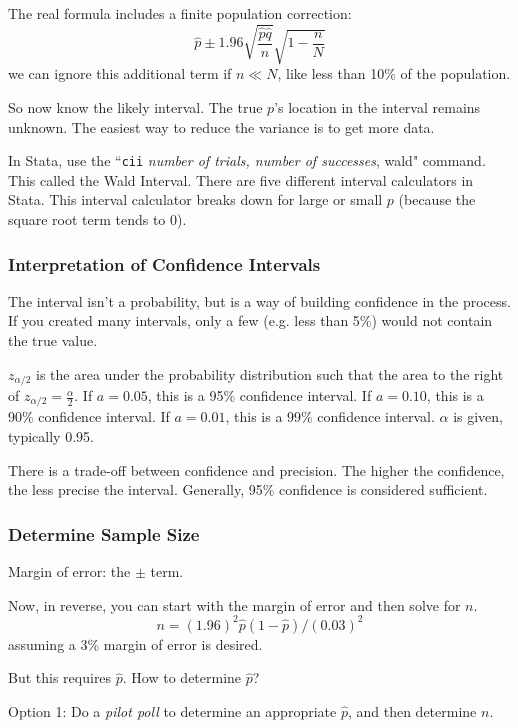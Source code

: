 \documentclass[11pt, oneside]{article}   	%
\begin{document}
The real formula includes a finite population correction:
\[
\hat{p} \pm 1.96 \sqrt{\frac{\hat{p}\hat{q}} {n} } \sqrt{ 1- \frac {n} {N} } 
\]
we can ignore this additional term if $n \ll N$, like less than 10\% of the population.

So now know the likely interval. The true $p$'s location in the interval remains unknown. The easiest way to reduce the variance is to get more data.

In Stata, use the ``\texttt{cii} \textit{number of trials, number of successes}, wald" command.  This called the Wald Interval. There are five different interval calculators in Stata. This interval calculator breaks down for large or small $p$ (because the square root term tends to 0).

\subsubsection{Interpretation of Confidence Intervals}

The interval isn't a probability, but is a way of building confidence in the process. If you created many intervals, only a few (e.g. less than 5\%) would not contain the true value.

$z_{\alpha/2}$ is the area under the probability distribution such that the area to the right of $z_{\alpha/2} = \frac{\alpha}{2}$. If $a = 0.05$, this is a 95\% confidence interval. If $a = 0.10$, this is a 90\% confidence interval. If $a = 0.01$, this is a 99\% confidence interval. $\alpha$ is given, typically 0.95.

There is a trade-off between confidence and precision. The higher the confidence, the less precise the interval. Generally, 95\% confidence is considered sufficient.


\subsubsection{Determine Sample Size}

Margin of error: the $\pm$ term.

Now, in reverse, you can start with the margin of error and then solve for $n$. 
\[
n = (1.96)^2\hat{p}(1-\hat{p}) / (0.03)^2 
\]
assuming a 3\% margin of error is desired.

But this requires $\hat{p}$. How to determine $\hat{p}$?

Option 1: Do a \textit{pilot poll} to determine an appropriate $\hat{p}$, and then determine $n$.
\end{document}
